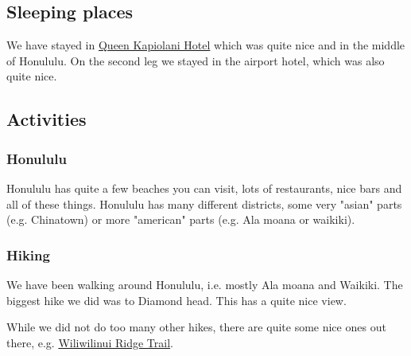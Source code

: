 \documentclass[11pt,a4paper,sans,english]{article}
\begin{document}
\subsection{Sleeping places}
We have stayed in \href{https://www.booking.com/hotel/us/castle-queen-kapiolani.de.html?aid=318615&label=New_German_DE_CH_20153971705-S6%2ALWXwOFxWcOJzS8j2k7gS634186709656%3Apl%3Ata%3Ap1%3Ap2%3Aac%3Aap%3Aneg%3Afi%3Atiaud-297601666995%3Adsa-64415224945%3Alp20126%3Ali%3Adec%3Adm%3Aag20153971705%3Acmp313804345&sid=a15b87db5efa027e9b71c5d5e5ac0b18&all_sr_blocks=18062436_91911162_2_0_0;checkin=2023-05-16;checkout=2023-05-19;dest_id=20030916;dest_type=city;dist=0;group_adults=2;group_children=0;hapos=1;highlighted_blocks=18062436_91911162_2_0_0;hpos=1;matching_block_id=18062436_91911162_2_0_0;no_rooms=1;req_adults=2;req_children=0;room1=A%2CA;sb_price_type=total;sr_order=popularity;sr_pri_blocks=18062436_91911162_2_0_0__76555;srepoch=1679604129;srpvid=c9c2918fe6a50003;type=total;ucfs=1&#hotelTmpl}{Queen Kapiolani Hotel} which was quite nice and in the middle of Honululu. On the second leg we stayed in the airport hotel, which was also quite nice.
\subsection{Activities}
\subsubsection{Honululu}
Honululu has quite a few beaches you can visit, lots of restaurants, nice bars and all of these things. Honululu has many different districts, some very "asian" parts (e.g. Chinatown) or more "american" parts (e.g. Ala moana or waikiki).
\subsubsection{Hiking}
We have been walking around Honululu, i.e. mostly Ala moana and Waikiki. The biggest hike we did was to Diamond head. This has a quite nice view.

While we did not do too many other hikes, there are quite some nice ones out there, e.g. \href{https://www.google.com/maps/place/Wiliwilinui+Ridge+Trail/@21.2990018,-157.7626496,3a,75y,90t/data=!3m8!1e2!3m6!1sAF1QipOX2D0XrLsWhbfhpLxErdWDhM3vmblX6s3Yt1KS!2e10!3e12!6shttps:%2F%2Flh5.googleusercontent.com%2Fp%2FAF1QipOX2D0XrLsWhbfhpLxErdWDhM3vmblX6s3Yt1KS%3Dw152-h86-k-no!7i4000!8i2252!4m16!1m8!3m7!1s0x7bffdb064f79e005:0x4b7782d274cc8628!2sHawaii,+USA!3b1!8m2!3d19.8967662!4d-155.5827818!16zL20vMDNnaDQ!3m6!1s0x7c006d34a758a5d1:0x5a7f2802644997d2!8m2!3d21.2990018!4d-157.7626496!10e5!16s%2Fg%2F11bxdz3_5n}{Wiliwilinui Ridge Trail}.
\end{document}
